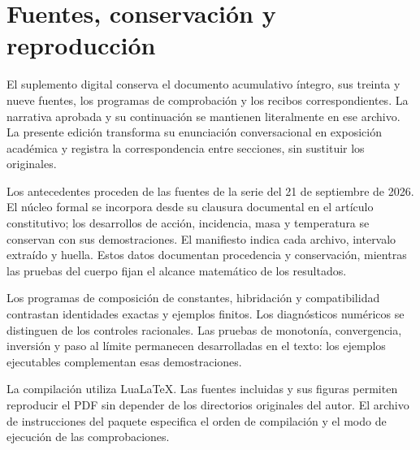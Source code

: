 \section{Fuentes, conservación y reproducción}
El suplemento digital conserva el documento acumulativo íntegro, sus
treinta y nueve fuentes, los programas de comprobación y los recibos
correspondientes. La narrativa aprobada y su continuación se mantienen
literalmente en ese archivo. La presente edición transforma su
enunciación conversacional en exposición académica y registra la
correspondencia entre secciones, sin sustituir los originales.

Los antecedentes proceden de las fuentes de la serie del 21 de
septiembre de 2026. El núcleo formal se incorpora desde su clausura
documental en el artículo constitutivo; los desarrollos de acción,
incidencia, masa y temperatura se conservan con sus demostraciones.
El manifiesto indica cada archivo, intervalo extraído y huella. Estos
datos documentan procedencia y conservación, mientras las pruebas del
cuerpo fijan el alcance matemático de los resultados.

Los programas de composición de constantes, hibridación y
compatibilidad contrastan identidades exactas y ejemplos finitos.
Los diagnósticos numéricos se distinguen de los controles racionales.
Las pruebas de monotonía, convergencia, inversión y paso al límite
permanecen desarrolladas en el texto: los ejemplos ejecutables
complementan esas demostraciones.

La compilación utiliza LuaLaTeX. Las fuentes incluidas y sus figuras
permiten reproducir el PDF sin depender de los directorios originales
del autor. El archivo de instrucciones del paquete especifica el orden
de compilación y el modo de ejecución de las comprobaciones.
